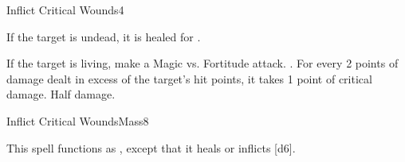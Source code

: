 \begin{spellsection}{Inflict Critical Wounds}{4}
\begin{spellheader}
\end{spellheader}
\begin{spellcontent}
    \begin{spelltargetinginfo}
    \end{spelltargetinginfo}
    \begin{spelleffects}
        \spelleffect If the target is undead, it is healed for .
        \begin{spellattacktriggered}{If the target is living, make a Magic vs. Fortitude attack.}
            \spellsuccess {}. For every 2 points of damage dealt in excess of the target's hit points, it takes 1 point of critical damage.
            \spellfailure Half damage.
        \end{spellattacktriggered}
    \end{spelleffects}
\end{spellcontent}
\begin{spellfooter}
\end{spellfooter}
\end{spellsection}

\begin{spellsection}{Inflict Critical Wounds}{Mass}{8}
\begin{spellheader}
\end{spellheader}
\begin{spellcontent}
    \begin{spelltargetinginfo}
    \end{spelltargetinginfo}
    \begin{spelleffects}
        \spellspecial This spell functions as , except that it heals or inflicts [d6].
    \end{spelleffects}
\end{spellcontent}
\begin{spellfooter}
\end{spellfooter}
\end{spellsection}

